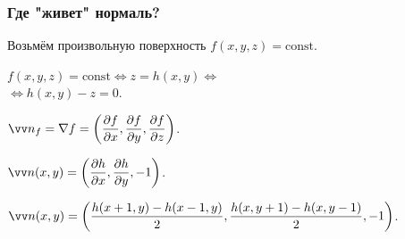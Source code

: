 \documentclass[10pt]{beamer}
\begin{document}
\begin{frame}\frametitle {Где "живет" нормаль?}
	
	{
	}{
		Возьмём произвольную поверхность $f(x,y,z)=\text{const}$.
		
		\medskip\pause
		
		$f(x,y,z)=\text{const} \Leftrightarrow  z = h(x,y)\Leftrightarrow$\\
		$\Leftrightarrow h(x,y)-z=0 $.
		
		\medskip\pause
		
		$\vv n_f = \nabla f = \left( \dfrac{\partial f}{\partial x},\dfrac{\partial f}{\partial y},\dfrac{\partial f}{\partial z} \right)$.
		
		\medskip\pause
		
		$\vv n(x,y) = \left( \dfrac{\partial h}{\partial x},\dfrac{\partial h}{\partial y},-1 \right)$.
	}
	
	\medskip\pause
	
	$\vv n(x,y) = \left(\dfrac{h(x+1,y)-h(x-1,y) }{2},\dfrac{h(x,y+1)-h(x,y-1) }{2}, -1  \right) $.
	
\end{frame}
	
\end{document}
